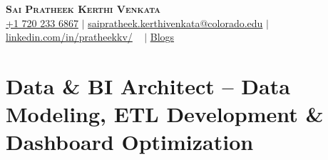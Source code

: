 \documentclass[letterpaper,6pt]{article}
\begin{document}

\begin{center}
    \textbf{\Large \scshape Sai Pratheek Kerthi Venkata} \\ \vspace{3pt}
    \small
    \faMobile \hspace{.5pt} \href{tel:+17202336867}{+1 720 233 6867}
    $|$
    \faAt \hspace{.5pt} \href{mailto:saipratheek.kerthivenkata@colorado.edu}{saipratheek.kerthivenkata@colorado.edu}
    $|$
    \faLinkedinSquare \hspace{.5pt} \href{https://www.linkedin.com/in/pratheekkv/}{linkedin.com/in/pratheekkv/}
    \
    $|$
    \faRssSquare \hspace{.5pt}
    \href{https://www.cloudthat.com/resources/author/sai-pratheek/}{Blogs}
\end{center}
\vspace{-18pt}
\small


\section{Data \& BI Architect -- Data Modeling, ETL Development \& Dashboard Optimization}

\end{document}
